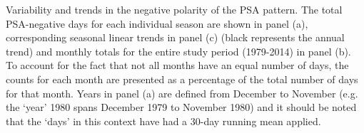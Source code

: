 \label{fig:psa-neg_seasonality}
Variability and trends in the negative polarity of the PSA pattern. The total PSA-negative days for each individual season are shown in panel (a), corresponding seasonal linear trends in panel (c) (black represents the annual trend) and monthly totals for the entire study period (1979-2014) in panel (b). To account for the fact that not all months have an equal number of days, the counts for each month are presented as a percentage of the total number of days for that month. Years in panel (a) are defined from December to November (e.g. the `year' 1980 spans December 1979 to November 1980) and it should be noted that the `days' in this context have had a 30-day running mean applied.
